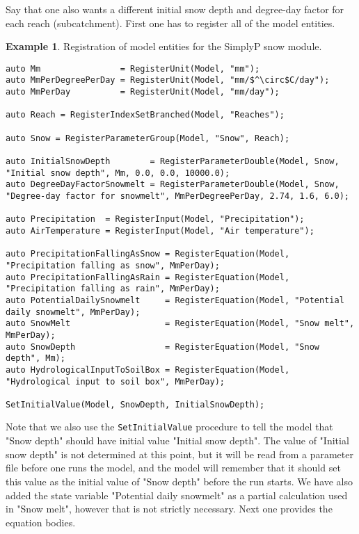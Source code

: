 \documentclass[11pt]{article}
\theoremstyle{definition}
\newtheorem{myexample}{Example}
\newenvironment{example}%
  {\begin{lrbox}{\examplebox}%
   \begin{minipage}{\dimexpr\linewidth-2\fboxsep}
   \begin{myexample}}%
  {\end{myexample}%
   \end{minipage}%
   \end{lrbox}%
   \begin{trivlist}
     \item[]\colorbox{silver}{\usebox\examplebox}
   \end{trivlist}}
\begin{document}
Say that one also wants a different initial snow depth and degree-day factor for each reach (subcatchment). First one has to register all of the model entities.
\begin{example}
Registration of model entities for the SimplyP snow module.
\begin{lstlisting}[style=mycpp,mathescape]
auto Mm                = RegisterUnit(Model, "mm");
auto MmPerDegreePerDay = RegisterUnit(Model, "mm/$^\circ$C/day");
auto MmPerDay          = RegisterUnit(Model, "mm/day");

auto Reach = RegisterIndexSetBranched(Model, "Reaches");

auto Snow = RegisterParameterGroup(Model, "Snow", Reach);

auto InitialSnowDepth        = RegisterParameterDouble(Model, Snow, "Initial snow depth", Mm, 0.0, 0.0, 10000.0);
auto DegreeDayFactorSnowmelt = RegisterParameterDouble(Model, Snow, "Degree-day factor for snowmelt", MmPerDegreePerDay, 2.74, 1.6, 6.0);

auto Precipitation  = RegisterInput(Model, "Precipitation");
auto AirTemperature = RegisterInput(Model, "Air temperature");

auto PrecipitationFallingAsSnow = RegisterEquation(Model, "Precipitation falling as snow", MmPerDay);
auto PrecipitationFallingAsRain = RegisterEquation(Model, "Precipitation falling as rain", MmPerDay);
auto PotentialDailySnowmelt     = RegisterEquation(Model, "Potential daily snowmelt", MmPerDay);
auto SnowMelt                   = RegisterEquation(Model, "Snow melt", MmPerDay);
auto SnowDepth                  = RegisterEquation(Model, "Snow depth", Mm);
auto HydrologicalInputToSoilBox = RegisterEquation(Model, "Hydrological input to soil box", MmPerDay);

SetInitialValue(Model, SnowDepth, InitialSnowDepth);
\end{lstlisting}
\end{example}

Note that we also use the {\tt SetInitialValue} procedure to tell the model that "Snow depth" should have initial value "Initial snow depth". The value of "Initial snow depth" is not determined at this point, but it will be read from a parameter file before one runs the model, and the model will remember that it should set this value as the initial value of "Snow depth" before the run starts. We have also added the state variable "Potential daily snowmelt" as a partial calculation used in "Snow melt", however that is not strictly necessary. Next one provides the equation bodies.
\end{document}
